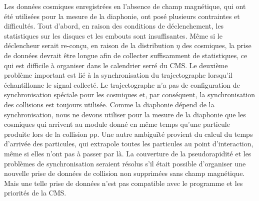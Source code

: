 
Les données cosmiques enregistrées en l'absence de champ magnétique, qui ont été utilisées pour la mesure de la diaphonie, ont posé plusieurs contraintes et difficultés. Tout d'abord, en raison des conditions de déclenchement, les statistiques sur les disques et les embouts sont insuffisantes. Même si le déclencheur serait re-conçu, en raison de la distribution $\eta$ des cosmiques, la prise de données devrait être longue afin de collecter suffisamment de statistiques, ce qui est difficile à organiser dans le calendrier serré du CMS. Le deuxième problème important est lié à la synchronisation du trajectographe lorsqu'il échantillonne le signal collecté. Le trajectographe n'a pas de configuration de synchronisation spéciale pour les cosmiques et, par conséquent, la synchronisation des collisions est toujours utilisée. Comme la diaphonie dépend de la synchronisation, nous ne devons utiliser pour la mesure de la diaphonie que les cosmiques qui arrivent au module donné en même temps qu’une particule produite lors de la collision pp. Une autre ambiguïté provient du calcul du temps d'arrivée des particules, qui extrapole toutes les particules au point d'interaction, même si elles n'ont pas à passer par là. La couverture de la pseudorapidité et les problèmes de synchronisation seraient résolus s'il était possible d'organiser une nouvelle prise de données de collision non supprimées sans champ magnétique. Mais une telle prise de données n'est pas compatible avec le programme et les priorités de la CMS.

